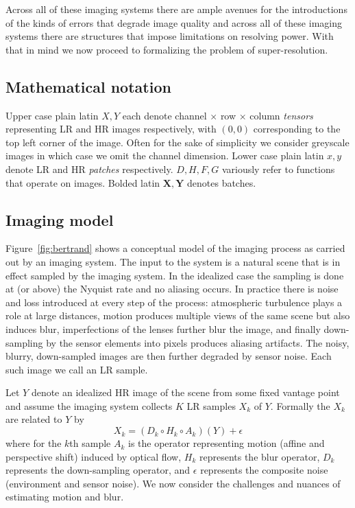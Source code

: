Across all of these imaging systems there are ample avenues for the introductions of the kinds of errors that degrade image quality and across all of these imaging systems there are structures that impose limitations on resolving power.
%
With that in mind we now proceed to formalizing the problem of super-resolution.

\subsection{Mathematical notation}\label{subsec:notation}
Upper case plain latin $X, Y$ each denote channel $\times$ row $\times$ column \textit{tensors} representing LR and HR images respectively, with $(0,0)$ corresponding to the top left corner of the image.
%
Often for the sake of simplicity we consider greyscale images in which case we omit the channel dimension.
%
Lower case plain latin $x, y$ denote LR and HR \textit{patches} respectively.
%
$D, H, F, G$ variously refer to functions that operate on images.
%
Bolded latin $\bm{X}, \bm{Y}$ denotes batches.

\subsection{Imaging model}\label{subsec:imaging-model}
Figure~\ref{fig:bertrand} shows a conceptual model of the imaging process as carried out by an imaging system.
%
The input to the system is a natural scene that is in effect sampled by the imaging system.
%
In the idealized case the sampling is done at (or above) the Nyquist rate and no aliasing occurs.
%
In practice there is noise and loss introduced at every step of the process: atmospheric turbulence plays a role at large distances, motion produces multiple views of the same scene but also induces blur, imperfections of the lenses further blur the image, and finally down-sampling by the sensor elements into pixels produces aliasing artifacts.
%
The noisy, blurry, down-sampled images are then further degraded by sensor noise.
%
Each such image we call an LR sample.

Let $Y$ denote an idealized HR image of the scene from some fixed vantage point and assume the imaging system collects $K$ LR samples $X_k$ of $Y$.
%
Formally the $X_k$ are related to $Y$ by
\begin{equation}
    X_k = (D_k \circ H_k \circ A_k) (Y) + \epsilon
\end{equation}
where for the $k$th sample $A_k$ is the operator representing motion (affine and perspective shift) induced by optical flow, $H_k$ represents the blur operator, $D_k$ represents the down-sampling operator, and $\epsilon$ represents the composite noise (environment and sensor noise). We now consider the challenges and nuances of estimating motion and blur.

